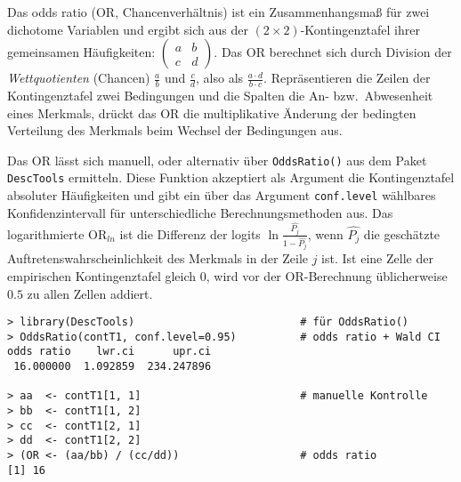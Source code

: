 Das odds ratio (OR, Chancenverhältnis) ist ein Zusammenhangsmaß für zwei dichotome Variablen und ergibt sich aus der $(2 \times 2)$-Kontingenztafel ihrer gemeinsamen Häufigkeiten: $\left( \begin{smallmatrix} a & b\\ c & d \end{smallmatrix} \right)$. %
Das OR berechnet sich durch Division der \emph{Wettquotienten} (Chancen) $\frac{a}{b}$ und $\frac{c}{d}$, also als $\frac{a \cdot d}{b \cdot c}$. Repräsentieren die Zeilen der Kontingenztafel zwei Bedingungen und die Spalten die An- bzw.\ Abwesenheit eines Merkmals, drückt das OR die multiplikative Änderung der bedingten Verteilung des Merkmals beim Wechsel der Bedingungen aus.

Das OR lässt sich manuell, oder alternativ über \lstinline!OddsRatio()! aus dem Paket \lstinline!DescTools! ermitteln. Diese Funktion akzeptiert als Argument die Kontingenztafel absoluter Häufigkeiten und gibt ein über das Argument \lstinline!conf.level! wählbares Konfidenzintervall für unterschiedliche Berechnungsmethoden aus. Das logarithmierte $\text{OR}_{ln}$ ist die Differenz der logits $\ln \frac{\hat{P_{j}}}{1-\hat{P_{j}}}$, wenn $\hat{P_{j}}$ die geschätzte Auftretenswahrscheinlichkeit des Merkmals in der Zeile $j$ ist. Ist eine Zelle der empirischen Kontingenztafel gleich $0$, wird vor der OR-Berechnung üblicherweise $0.5$ zu allen Zellen addiert.
\begin{lstlisting}
> library(DescTools)                          # für OddsRatio()
> OddsRatio(contT1, conf.level=0.95)          # odds ratio + Wald CI
odds ratio    lwr.ci      upr.ci
 16.000000  1.092859  234.247896

> aa  <- contT1[1, 1]                         # manuelle Kontrolle
> bb  <- contT1[1, 2]
> cc  <- contT1[2, 1]
> dd  <- contT1[2, 2]
> (OR <- (aa/bb) / (cc/dd))                   # odds ratio
[1] 16
\end{lstlisting}

